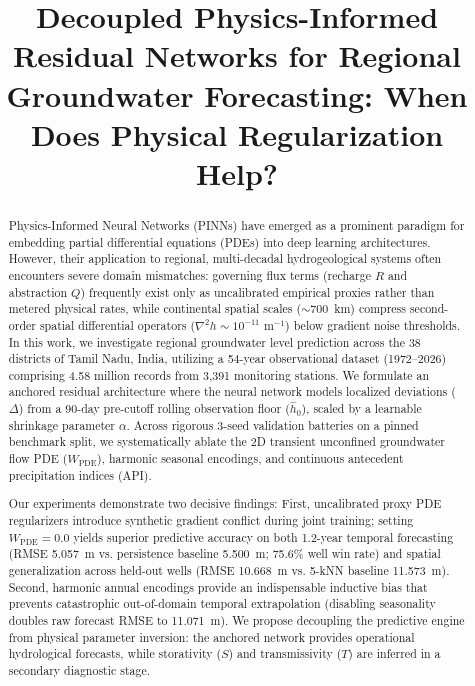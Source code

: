 \documentclass[10pt,conference,letterpaper]{IEEEtran}
\begin{document}
\title{Decoupled Physics-Informed Residual Networks for Regional Groundwater Forecasting: When Does Physical Regularization Help?}

\author{
\and
{}
}

\maketitle

\begin{abstract}
Physics-Informed Neural Networks (PINNs) have emerged as a prominent paradigm for embedding partial differential equations (PDEs) into deep learning architectures. However, their application to regional, multi-decadal hydrogeological systems often encounters severe domain mismatches: governing flux terms (recharge $R$ and abstraction $Q$) frequently exist only as uncalibrated empirical proxies rather than metered physical rates, while continental spatial scales ($\sim 700$~km) compress second-order spatial differential operators ($\nabla^2 h \sim 10^{-11}\text{ m}^{-1}$) below gradient noise thresholds. In this work, we investigate regional groundwater level prediction across the 38 districts of Tamil Nadu, India, utilizing a 54-year observational dataset (1972--2026) comprising 4.58 million records from 3,391 monitoring stations. We formulate an anchored residual architecture where the neural network models localized deviations ($\Delta$) from a 90-day pre-cutoff rolling observation floor ($\hat{h}_0$), scaled by a learnable shrinkage parameter $\alpha$. Across rigorous 3-seed validation batteries on a pinned benchmark split, we systematically ablate the 2D transient unconfined groundwater flow PDE ($W_{\text{PDE}}$), harmonic seasonal encodings, and continuous antecedent precipitation indices (API).

Our experiments demonstrate two decisive findings: First, uncalibrated proxy PDE regularizers introduce synthetic gradient conflict during joint training; setting $W_{\text{PDE}} = 0.0$ yields superior predictive accuracy on both 1.2-year temporal forecasting (RMSE 5.057~m vs. persistence baseline 5.500~m; 75.6\% well win rate) and spatial generalization across held-out wells (RMSE 10.668~m vs. 5-kNN baseline 11.573~m). Second, harmonic annual encodings provide an indispensable inductive bias that prevents catastrophic out-of-domain temporal extrapolation (disabling seasonality doubles raw forecast RMSE to 11.071~m). We propose decoupling the predictive engine from physical parameter inversion: the anchored network provides operational hydrological forecasts, while storativity ($S$) and transmissivity ($T$) are inferred in a secondary diagnostic stage.
\end{abstract}
\end{document}
